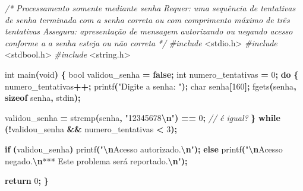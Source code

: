 \documentclass[
  11pt,
  a4paper,
]{scrbook}
\newenvironment{Shaded}{\begin{snugshade}}{\end{snugshade}}
\newcommand{\CommentTok}[1]{\textcolor[rgb]{0.56,0.35,0.01}{\textit{#1}}}
\newcommand{\ControlFlowTok}[1]{\textcolor[rgb]{0.13,0.29,0.53}{\textbf{#1}}}
\newcommand{\DataTypeTok}[1]{\textcolor[rgb]{0.13,0.29,0.53}{#1}}
\newcommand{\DecValTok}[1]{\textcolor[rgb]{0.00,0.00,0.81}{#1}}
\newcommand{\ImportTok}[1]{#1}
\newcommand{\KeywordTok}[1]{\textcolor[rgb]{0.13,0.29,0.53}{\textbf{#1}}}
\newcommand{\NormalTok}[1]{#1}
\newcommand{\OperatorTok}[1]{\textcolor[rgb]{0.81,0.36,0.00}{\textbf{#1}}}
\newcommand{\PreprocessorTok}[1]{\textcolor[rgb]{0.56,0.35,0.01}{\textit{#1}}}
\newcommand{\SpecialCharTok}[1]{\textcolor[rgb]{0.81,0.36,0.00}{\textbf{#1}}}
\newcommand{\StringTok}[1]{\textcolor[rgb]{0.31,0.60,0.02}{#1}}
\begin{document}
\begin{Shaded}
\begin{Highlighting}[]
\CommentTok{/*}
\CommentTok{Processamento somente mediante senha}
\CommentTok{Requer: uma sequência de tentativas de senha terminada com a senha correta}
\CommentTok{    ou com comprimento máximo de três tentativas}
\CommentTok{Assegura: apresentação de mensagem autorizando ou negando acesso conforme a}
\CommentTok{    a senha esteja ou não correta}
\CommentTok{*/}
\PreprocessorTok{\#include }\ImportTok{\textless{}stdio.h\textgreater{}}
\PreprocessorTok{\#include }\ImportTok{\textless{}stdbool.h\textgreater{}}
\PreprocessorTok{\#include }\ImportTok{\textless{}string.h\textgreater{}}

\DataTypeTok{int}\NormalTok{ main}\OperatorTok{(}\DataTypeTok{void}\OperatorTok{)} \OperatorTok{\{}
    \DataTypeTok{bool}\NormalTok{ validou\_senha }\OperatorTok{=} \KeywordTok{false}\OperatorTok{;}
    \DataTypeTok{int}\NormalTok{ numero\_tentativas }\OperatorTok{=} \DecValTok{0}\OperatorTok{;}
    \ControlFlowTok{do} \OperatorTok{\{}
\NormalTok{        numero\_tentativas}\OperatorTok{++;}
\NormalTok{        printf}\OperatorTok{(}\StringTok{"Digite a senha: "}\OperatorTok{);}
        \DataTypeTok{char}\NormalTok{ senha}\OperatorTok{[}\DecValTok{160}\OperatorTok{];}
\NormalTok{        fgets}\OperatorTok{(}\NormalTok{senha}\OperatorTok{,} \KeywordTok{sizeof}\NormalTok{ senha}\OperatorTok{,}\NormalTok{ stdin}\OperatorTok{);}

\NormalTok{        validou\_senha }\OperatorTok{=}\NormalTok{ strcmp}\OperatorTok{(}\NormalTok{senha}\OperatorTok{,} \StringTok{"12345678}\SpecialCharTok{\textbackslash{}n}\StringTok{"}\OperatorTok{)} \OperatorTok{==} \DecValTok{0}\OperatorTok{;} \CommentTok{// é igual?}
    \OperatorTok{\}} \ControlFlowTok{while} \OperatorTok{(!}\NormalTok{validou\_senha }\OperatorTok{\&\&}\NormalTok{ numero\_tentativas }\OperatorTok{\textless{}} \DecValTok{3}\OperatorTok{);}

    \ControlFlowTok{if} \OperatorTok{(}\NormalTok{validou\_senha}\OperatorTok{)}
\NormalTok{        printf}\OperatorTok{(}\StringTok{"}\SpecialCharTok{\textbackslash{}n}\StringTok{Acesso autorizado.}\SpecialCharTok{\textbackslash{}n}\StringTok{"}\OperatorTok{);}
    \ControlFlowTok{else}
\NormalTok{        printf}\OperatorTok{(}\StringTok{"}\SpecialCharTok{\textbackslash{}n}\StringTok{Acesso negado.}\SpecialCharTok{\textbackslash{}n}\StringTok{*** Este problema será reportado.}\SpecialCharTok{\textbackslash{}n}\StringTok{"}\OperatorTok{);}

    \ControlFlowTok{return} \DecValTok{0}\OperatorTok{;}
\OperatorTok{\}}
\end{Highlighting}
\end{Shaded}
\end{document}
